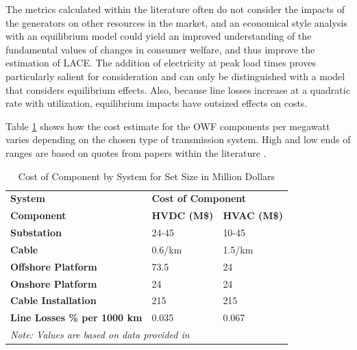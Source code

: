 \documentclass{ieeeaccess}
\begin{document}
The metrics calculated within the literature often do not consider the impacts of the generators on other resources in the market, and an economical style analysis with an equilibrium model could yield an improved understanding of the fundamental values of changes in consumer welfare, and thus improve the estimation of LACE. The addition of electricity at peak load times proves particularly salient for consideration and can only be distinguished with a model that considers equilibrium effects. Also, because line losses increase at a quadratic rate with utilization, equilibrium impacts have outsized effects on costs.

Table \ref{tab:COst MIllions} shows how the cost estimate for the OWF components per megawatt varies depending on the chosen type of transmission system. High and low ends of ranges are based on quotes from papers within the literature \cite{kucuksari2019impact,meng2021comparative,xiang2021comparison,hardy2019techno,liu2023life}. 


\begin{table}[htbp]
\renewcommand{\arrayrulewidth}{1.1pt} %
\renewcommand{\arraystretch}{1.2} %
\renewcommand{\tabcolsep}{5pt}
\small
\caption{Cost of Component by System for Set Size in Million Dollars}
\label{tab:COst MIllions}
\centering

\begin{tabular}{|p{3.6cm}<{\raggedright\arraybackslash}| p{1.7cm}<{\centering}| p{1.79cm}<{\centering}|}
\hline
\textbf{System} & \multicolumn{2}{l|}{\textbf{Cost of Component}} \\ 
\hhline{|>{\arrayrulecolor{white}}-|>{\arrayrulecolor{black}}--}
\textbf{Component} & {\bfseries HVDC (M\$)} & {\bfseries HVAC (M\$)} \\ 
\hline
\textbf{Substation} & 24-45 & 10-45 \\ 
\hline
\textbf{Cable} & 0.6/km & 1.5/km \\ 
\hline
\textbf{Offshore Platform} & 73.5 & 24 \\ 
\hline
\textbf{Onshore Platform} & 24 & 24 \\ 
\hline
\textbf{Cable Installation} & 215 & 215 \\ 
\hline
\textbf{Line Losses \% per 1000 km} & 0.035 & 0.067 \\ 
\hline
\multicolumn{3}{p{8cm}}{\textit{Note: Values are based on data provided in \cite{kucuksari2019impact,meng2021comparative,xiang2021comparison,hardy2019techno,liu2023life}}} \\ 
\hline
\end{tabular}
\end{table}
\end{document}
